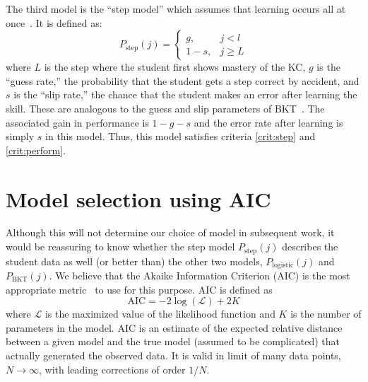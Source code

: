 \documentclass{acmlarge-edm}
\begin{document}
The third model is the ``step model'' which assumes that learning 
occurs all at once~\cite{baker_detecting_2011}.  It is defined as:
%
\begin{equation}
    P_\mathrm{step}(j)= \left\{\begin{array}{cc}
                 g, & j<l \\
                 1-s, & j\ge L 
                 \end{array} \right. 
\end{equation}
%
where $L$ is the step where the student first shows mastery of the KC,
$g$ is the ``guess rate,'' the probability that the student gets a
step correct by accident, and $s$ is the ``slip rate,'' the chance
that the student makes an error after learning the skill.  These are
analogous to the guess and slip parameters of
BKT~\cite{corbett_knowledge_1994}.  The associated gain in performance
is $1-g-s$ and the error rate after learning is simply $s$ in this
model.  Thus, this model satisfies criteria \ref{crit:step} and
\ref{crit:perform}.

\section{Model selection using AIC}
\label{model-selection}

Although this will not determine our choice of model in subsequent
work, it would be reassuring to know whether the step model
$P_\mathrm{step}(j)$ describes the student data as well (or better
than) the other two models, $P_\mathrm{logistic}(j)$ and
$P_\mathrm{BKT}(j)$.  We believe that the Akaike Information Criterion
(AIC) is the most appropriate
metric~\cite{akaike_new_1974,burnham_model_2002} to use for this
purpose.  AIC is defined as
%
\begin{equation}
   \mathrm{AIC}= -2 \log\left(\mathcal{L}\right) + 2K
\end{equation}
% 
where $\mathcal{L}$ is the maximized value of the likelihood function
and $K$ is the number of parameters in the model.
 AIC is an estimate of the expected relative distance 
between a given model and the true model (assumed to be complicated) 
that actually generated the observed data.  It is valid in limit of 
many data points, $N\to\infty$, with leading corrections of order $1/N$.
\end{document}
